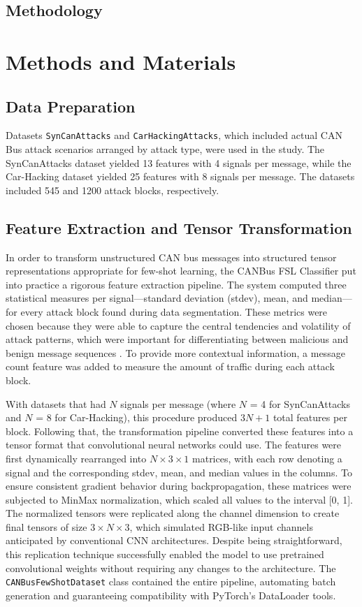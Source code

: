 \subsection{Methodology}
\label{subsec:methodology}

\section{Methods and Materials}
\subsection{Data Preparation}
Datasets \texttt{SynCanAttacks} and \texttt{CarHackingAttacks}, which included actual CAN Bus attack scenarios arranged by attack type, were used in the study. The SynCanAttacks dataset yielded 13 features with 4 signals per message, while the Car-Hacking dataset \cite{seo2018carhacking} yielded 25 features with 8 signals per message. The datasets included 545 and 1200 attack blocks, respectively.

\subsection{Feature Extraction and Tensor Transformation}
In order to transform unstructured CAN bus messages into structured tensor representations appropriate for few-shot learning, the CANBus FSL Classifier put into practice a rigorous feature extraction pipeline. The system computed three statistical measures per signal—standard deviation (stdev), mean, and median—for every attack block found during data segmentation. These metrics were chosen because they were able to capture the central tendencies and volatility of attack patterns, which were important for differentiating between malicious and benign message sequences \cite{deng2013time}. To provide more contextual information, a message count feature was added to measure the amount of traffic during each attack block.

With datasets that had $N$ signals per message (where $N$ = 4 for SynCanAttacks and $N$ = 8 for Car-Hacking), this procedure produced $3N + 1$ total features per block. Following that, the transformation pipeline converted these features into a tensor format that convolutional neural networks could use. The features were first dynamically rearranged into $N \times 3 \times 1$ matrices, with each row denoting a signal and the corresponding stdev, mean, and median values in the columns. To ensure consistent gradient behavior during backpropagation, these matrices were subjected to MinMax normalization, which scaled all values to the interval [0, 1]. The normalized tensors were replicated along the channel dimension to create final tensors of size $3 \times N \times 3$, which simulated RGB-like input channels anticipated by conventional CNN architectures. Despite being straightforward, this replication technique successfully enabled the model to use pretrained convolutional weights without requiring any changes to the architecture. The \texttt{CANBusFewShotDataset} class contained the entire pipeline, automating batch generation and guaranteeing compatibility with PyTorch's DataLoader tools.

